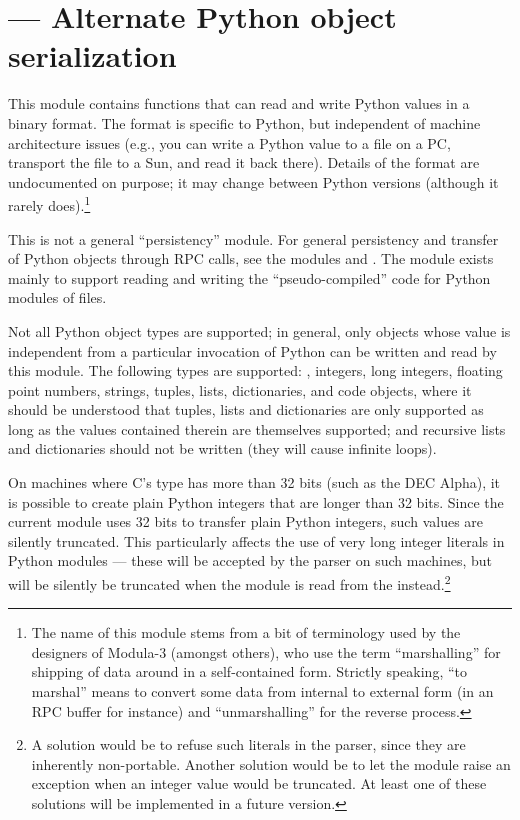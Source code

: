 \section{ ---
         Alternate Python object serialization}



This module contains functions that can read and write Python
values in a binary format.  The format is specific to Python, but
independent of machine architecture issues (e.g., you can write a
Python value to a file on a PC, transport the file to a Sun, and read
it back there).  Details of the format are undocumented on purpose;
it may change between Python versions (although it rarely
does).\footnote{The name of this module stems from a bit of
  terminology used by the designers of Modula-3 (amongst others), who
  use the term ``marshalling'' for shipping of data around in a
  self-contained form. Strictly speaking, ``to marshal'' means to
  convert some data from internal to external form (in an RPC buffer for
  instance) and ``unmarshalling'' for the reverse process.}

This is not a general ``persistency'' module.  For general persistency
and transfer of Python objects through RPC calls, see the modules
 and .  The  module exists
mainly to support reading and writing the ``pseudo-compiled'' code for
Python modules of  files.

Not all Python object types are supported; in general, only objects
whose value is independent from a particular invocation of Python can
be written and read by this module.  The following types are supported:
, integers, long integers, floating point numbers,
strings, tuples, lists, dictionaries, and code objects, where it
should be understood that tuples, lists and dictionaries are only
supported as long as the values contained therein are themselves
supported; and recursive lists and dictionaries should not be written
(they will cause infinite loops).

 On machines where C's  type has more than
32 bits (such as the DEC Alpha), it
is possible to create plain Python integers that are longer than 32
bits.  Since the current  module uses 32 bits to
transfer plain Python integers, such values are silently truncated.
This particularly affects the use of very long integer literals in
Python modules --- these will be accepted by the parser on such
machines, but will be silently be truncated when the module is read
from the  instead.\footnote{
  A solution would be to refuse such literals in the parser,
  since they are inherently non-portable.  Another solution would be to
  let the  module raise an exception when an integer
  value would be truncated.  At least one of these solutions will be
  implemented in a future version.}

